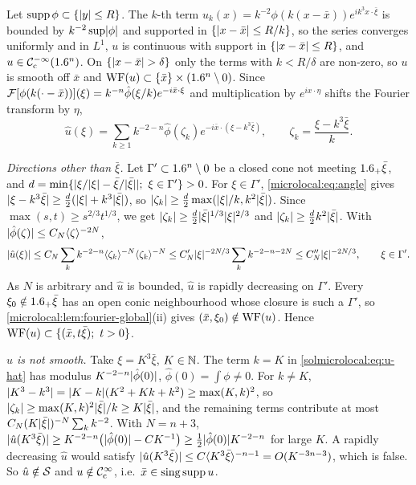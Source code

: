 Let $\operatorname{supp}\phi\subset\{\lvert y\rvert\le R\}$. The $k$-th term
$u_k(x)=k^{-2}\phi(k(x-\bar x))e^{ik^3x\cdot\bar\xi}$ is bounded by $k^{-2}\sup\lvert \phi\rvert$ and supported in
$\{\lvert x-\bar x\rvert\le R/k\}$, so the series converges uniformly and in $L^1$, $u$ is continuous with
support in $\{\lvert x-\bar x\rvert\le R\}$, and $u\in\mathcal{C}^{-\infty}_{\mathrm{c}}(1.6^n)$. On $\{\lvert x-\bar x\rvert>\delta\}$ only the terms
with $k<R/\delta$ are non-zero, so $u$ is smooth off $\bar x$ and $\operatorname{WF}(u)\subset\{\bar x\}\times(1.6^n\setminus0)$.
Since $\mathcal{F}[\phi(k(\cdot-\bar x))](\xi)=k^{-n}\hat\phi(\xi/k)e^{-i\bar x\cdot\xi}$ and multiplication by
$e^{ix\cdot\eta}$ shifts the Fourier transform by $\eta$,
\begin{equation}\label{solmicrolocal:eq:u-hat}
  \hat u(\xi)=\sum_{k\ge1}k^{-2-n}\hat\phi(\zeta_k)e^{-i\bar x\cdot(\xi-k^3\bar\xi)},\qquad
  \zeta_k=\frac{\xi-k^3\bar\xi}k .
\end{equation}

\emph{Directions other than $\bar\xi$.} Let $\Gamma'\subset1.6^n\setminus0$ be a closed cone not
meeting $1.6_+\bar\xi$, and $d=\min\{\abs{\xi/\abs\xi-\bar\xi/\abs{\bar\xi}};\ \xi\in\Gamma'\}>0$. For
$\xi\in\Gamma'$, \eqref{microlocal:eq:angle} gives
$\lvert \xi-k^3\bar\xi\rvert\ge\frac d2(\lvert \xi\rvert+k^3\lvert \bar\xi\rvert)$, so
$\lvert \zeta_k\rvert\ge\frac d2\max(\lvert \xi\rvert/k,k^2\lvert \bar\xi\rvert)$. Since
$\max(s,t)\ge s^{2/3}t^{1/3}$, we get $\lvert \zeta_k\rvert\ge\frac d2\lvert \bar\xi\rvert^{1/3}\lvert \xi\rvert^{2/3}$ and
$\lvert \zeta_k\rvert\ge\frac d2k^2\lvert \bar\xi\rvert$. With $\lvert \hat\phi(\zeta)\rvert\le C_N\langle \zeta\rangle^{-2N}$,
\begin{equation*}
  \lvert \hat u(\xi)\rvert\le C_N\sum_kk^{-2-n}\langle \zeta_k\rangle^{-N}\langle \zeta_k\rangle^{-N}
  \le C'_N\lvert \xi\rvert^{-2N/3}\sum_kk^{-2-n-2N}\le C''_N\lvert \xi\rvert^{-2N/3},\qquad\xi\in\Gamma'.
\end{equation*}
As $N$ is arbitrary and $\hat u$ is bounded, $\hat u$ is rapidly decreasing on $\Gamma'$. Every
$\xi_0\notin1.6_+\bar\xi$ has an open conic neighbourhood whose closure is such a $\Gamma'$, so
\cref{microlocal:lem:fourier-global}(ii) gives $(\bar x,\xi_0)\notin\operatorname{WF}(u)$. Hence
$\WF(u)\subset\{(\bar x,t\bar\xi);\ t>0\}$.

\emph{$u$ is not smooth.} Take $\xi=K^3\bar\xi$, $K\in\mathbb{N}$. The term $k=K$ in
\eqref{solmicrolocal:eq:u-hat} has modulus $K^{-2-n}\lvert \hat\phi(0)\rvert$, $\hat\phi(0)=\int\phi\ne0$. For
$k\ne K$, $\lvert K^3-k^3\rvert=\lvert K-k\rvert(K^2+Kk+k^2)\ge\max(K,k)^2$, so
$\lvert \zeta_k\rvert\ge\max(K,k)^2\lvert \bar\xi\rvert/k\ge K\lvert \bar\xi\rvert$, and the remaining terms contribute at most
$C_N(K\lvert \bar\xi\rvert)^{-N}\sum_kk^{-2}$. With $N=n+3$,
$\lvert \hat u(K^3\bar\xi)\rvert\ge K^{-2-n}\bigl(\lvert \hat\phi(0)\rvert-CK^{-1}\bigr)\ge\frac12\lvert \hat\phi(0)\rvert K^{-2-n}$ for
large $K$. A rapidly decreasing $\hat u$ would satisfy $\lvert \hat u(K^3\bar\xi)\rvert\le C\langle K^3\bar\xi\rangle^{-n-1}
=O(K^{-3n-3})$, which is false. So $\hat u\notin\mathcal{S}$ and $u\notin\mathcal{C}^\infty_{\mathrm{c}}$, i.e.\ $\bar x\in\operatorname{sing\,supp} u$.

